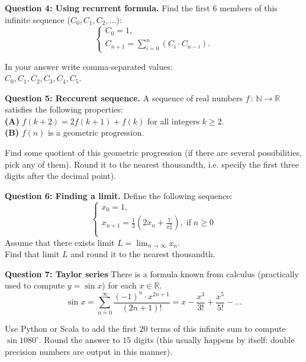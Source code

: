 \documentclass[jou]{apa6}
\begin{document}
\vspace{6pt}
{\bf Question 4: Using recurrent formula.}
Find the first $6$ members of this infinite sequence ($C_0,C_1,C_2,\ldots$): 
$$\left\{ \begin{array}{l} 
C_0 = 1,\\
C_{n+1} = \sum\limits_{i=0}^n (C_i \cdot C_{n-i}).
\end{array} \right.$$

In your answer write comma-separated values:\\
$C_0,C_1,C_2,C_3,C_4,C_5$.



\vspace{6pt}
{\bf Question 5: Reccurent sequence.} A sequence of real numbers 
$f\,:\,\mathbb{N} \rightarrow \mathbb{R}$ satisfies 
the following properties:\\
{\bf (A)} $f(k+2) = 2f(k+1) + f(k)$ for all integers $k \geq 2$.\\
{\bf (B)} $f(n)$ is a geometric progression.

Find some quotient of this geometric progression (if there are several possibilities, pick any of them). 
Round it to the nearest thousandth, i.e. specify the first three digits after the decimal point). 


\vspace{6pt}
{\bf Question 6: Finding a limit.} Define the following sequence: 
$$\left\{ \begin{array}{l} 
x_0 = 1,\\
x_{n+1} = \frac{1}{3} \left( 2x_n + \frac{7}{x_n^2}\right),\;\text{if}\;n\geq 0\\
\end{array} \right.$$
Assume that there exists limit $L = \lim_{n \rightarrow \infty} x_n$.\\
Find that limit $L$ and round it to 
the nearest thousandth. 



\vspace{6pt}
{\bf Question 7: Taylor series} There is a formula known from calculus (practically 
used to compute $y = \sin x$) for each $x \in \mathbb{R}$. 
$$\sin x = \sum\limits_{n=0}^{\infty} \frac{(-1)^n \cdot x^{2n+1}}{(2n+1)!} = x - \frac{x^3}{3!}
+ \frac{x^5}{5!} - \ldots$$

Use Python or Scala to add the first $20$ terms of this infinite sum
to compute $\sin 1080^{\circ}$. Round the answer
to $15$ digits (this usually happens by itself: double precision numbers are output in this manner).
\end{document}
